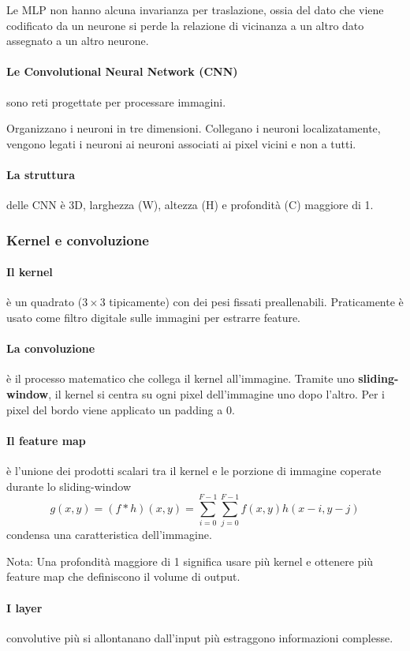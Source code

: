 Le MLP non hanno alcuna invarianza per traslazione, ossia del dato che viene codificato da un neurone si perde la relazione di vicinanza a un altro dato assegnato a un altro neurone.
\paragraph{Le Convolutional Neural Network (CNN)} sono reti progettate per processare immagini.

Organizzano i neuroni in tre dimensioni. Collegano i neuroni localizatamente, vengono legati i neuroni ai neuroni associati ai pixel vicini e non a tutti.
\paragraph{La struttura} delle CNN è 3D, larghezza (W), altezza (H) e profondità (C) maggiore di 1.
\subsubsection{Kernel e convoluzione}
\paragraph{Il kernel} è un quadrato ($3\times 3$ tipicamente) con dei pesi fissati preallenabili. Praticamente è usato come filtro digitale sulle immagini per estrarre feature.
\paragraph{La convoluzione} è il processo matematico che collega il kernel all'immagine. Tramite uno \textbf{sliding-window}, il kernel si centra su ogni pixel dell'immagine uno dopo l'altro.
Per i pixel del bordo viene applicato un padding a 0.

\paragraph{Il feature map} è l'unione dei prodotti scalari tra il kernel e le porzione di immagine coperate durante lo sliding-window \[g(x,y)=(f*h)(x,y)=\sum_{i=0}^{F-1}\sum_{j=0}^{F-1}f(x,y)h(x-i, y-j)\] condensa una caratteristica dell'immagine.

Nota: Una profondità maggiore di 1 significa usare più kernel e ottenere più feature map che definiscono il volume di output.
\paragraph{I layer} convolutive più si allontanano dall'input più estraggono informazioni complesse.
